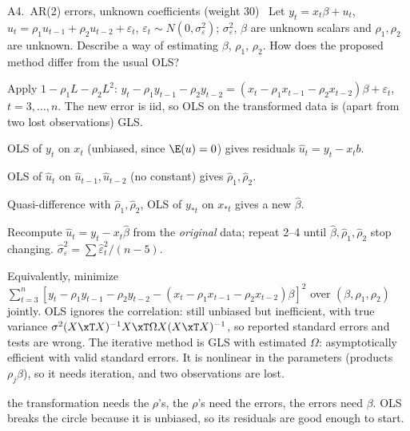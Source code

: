 \begin{qbox}{A4.\ AR(2) errors, unknown coefficients \quad(weight 30)}{\must\ }
Let $y_{t} = x_{t}\beta + u_{t}$, $u_{t} = \rho_{1}u_{t-1} + \rho_{2}u_{t-2} + \varepsilon_{t}$,
$\varepsilon_{t}\sim N(0,\sigma_{\varepsilon}^{2})$; $\sigma_{\varepsilon}^{2}$, $\beta$ are unknown scalars and
$\rho_{1},\rho_{2}$ are unknown. Describe a way of estimating $\beta$, $\rho_{1}$, $\rho_{2}$. How does the
proposed method differ from the usual OLS?
\end{qbox}
\begin{solbox}
 Apply $1-\rho_{1}L-\rho_{2}L^{2}$:
$y_{t}-\rho_{1}y_{t-1}-\rho_{2}y_{t-2} = (x_{t}-\rho_{1}x_{t-1}-\rho_{2}x_{t-2})\beta + \varepsilon_{t}$, $t=3,\dots,n$.
The new error is iid, so OLS on the transformed data is (apart from two lost observations) GLS.
\begin{flatnum}
  \item OLS of $y_{t}$ on $x_{t}$ (unbiased, since $\E(u)=0$) gives residuals $\hat u_{t}=y_{t}-x_{t}b$.
  \item OLS of $\hat u_{t}$ on $\hat u_{t-1},\hat u_{t-2}$ (no constant) gives $\hat\rho_{1},\hat\rho_{2}$.
  \item Quasi-difference with $\hat\rho_{1},\hat\rho_{2}$, OLS of $y_{*t}$ on $x_{*t}$ gives a new $\hat\beta$.
  \item Recompute $\hat u_{t}=y_{t}-x_{t}\hat\beta$ from the \emph{original} data; repeat 2--4 until
        $\hat\beta,\hat\rho_{1},\hat\rho_{2}$ stop changing. $\hat\sigma_{\varepsilon}^{2}=\sum\hat\varepsilon_{t}^{2}/(n-5)$.
\end{flatnum}
Equivalently, minimize $\sum_{t=3}^{n}[y_{t}-\rho_{1}y_{t-1}-\rho_{2}y_{t-2}-(x_{t}-\rho_{1}x_{t-1}-\rho_{2}x_{t-2})\beta]^{2}$
over $(\beta,\rho_{1},\rho_{2})$ jointly.
 OLS ignores the correlation: still unbiased but inefficient, with true variance
$\sigma^{2}(X\xT X)^{-1}X\xT\Omega X(X\xT X)^{-1}$, so reported standard errors and tests are wrong. The iterative method is
GLS with estimated $\Omega$: asymptotically efficient with valid standard errors. It is nonlinear in the parameters
(products $\rho_{j}\beta$), so it needs iteration, and two observations are lost.
\begin{why}\Why the transformation needs the $\rho$'s, the $\rho$'s need the errors, the errors need $\beta$. OLS breaks the
circle because it is unbiased, so its residuals are good enough to start.\end{why}
\end{solbox}

